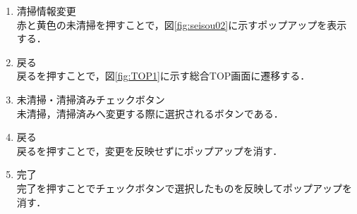 \begin{enumerate}
\renewcommand{\labelenumi}{\textcircled{\scriptsize \theenumi}}
\item 清掃情報変更\\ 赤と黄色の未清掃を押すことで，図\ref{fig:seisou02}に示すポップアップを表示する．
\item 戻る\\ 戻るを押すことで，図\ref{fig:TOP1}に示す総合TOP画面に遷移する．
\item 未清掃・清掃済みチェックボタン\\
未清掃，清掃済みへ変更する際に選択されるボタンである．
\item 戻る\\
戻るを押すことで，変更を反映せずにポップアップを消す．
\item 完了\\
完了を押すことでチェックボタンで選択したものを反映してポップアップを消す．
\end{enumerate}



